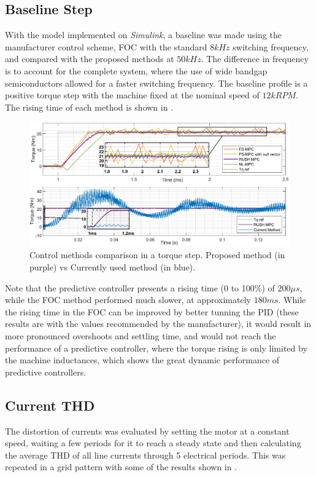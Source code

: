 \documentclass[9pt,conference]{IEEEtran}
\begin{document}
\subsection{Baseline Step}
With the model implemented on \textit{Simulink}, a baseline was made using the manufacturer control scheme, FOC with the standard $8kHz$ switching frequency, and compared with the proposed methods at $50kHz$. The difference in frequency is to account for the complete system, where the use of wide bandgap semiconductors allowed for a faster switching frequency. The baseline profile is a positive torque step with the machine fixed at the nominal speed of $12kRPM$. The rising time of each method is shown in .
\begin{figure}[!htb]
	\centering
    \includegraphics[clip, trim=0cm 0cm 0cm 5.5cm,width=.8\linewidth]{Figures/Step_@12000RPM.eps}
	\caption[Control methods comparison in a torque step.]{Control methods comparison in a torque step. Proposed method (in purple) vs Currently used method (in blue).}
	\label{fig:rising_time_4_models} %
\end{figure}

Note that the predictive controller presents a rising time (0 to 100\%) of $200\mu s$, while the FOC method performed much slower, at approximately $180ms$. While the rising time in the FOC can be improved by better tunning the PID (these results are with the values recommended by the manufacturer), it would result in more pronounced overshoots and settling time, and would not reach the performance of a predictive controller, where the torque rising is only limited by the machine inductances, which shows the great dynamic performance of predictive controllers.

\subsection{Current THD}

The distortion of currents was evaluated by setting the motor at a constant speed, waiting a few periods for it to reach a steady state and then calculating the average THD of all line currents through 5 electrical periods. This was repeated in a grid pattern with some of the results shown in .
\end{document}
